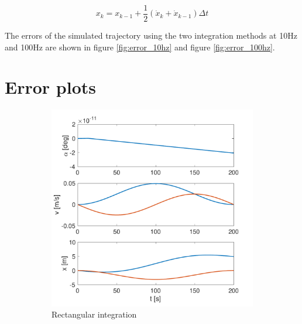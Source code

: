 \documentclass{article}
\begin{document}
\begin{equation*}
x_k = x_{k-1} + \frac{1}{2}(\dot x_k + \dot x_{k-1}) \Delta t 
\end{equation*}

The errors of the simulated trajectory using the two integration methods at 10Hz and 100Hz are shown
in figure \ref{fig:error_10hz} and figure \ref{fig:error_100hz}.

\section*{Error plots}
\begin{figure}[H]
    \centering
    \begin{subfigure}[t]{0.49\textwidth}
        \centering
        \includegraphics[width=\textwidth]{rectangular_int_10hz}
        \caption{Rectangular integration}
    \end{subfigure}
    ~
    \begin{subfigure}[t]{0.49\textwidth}
        \centering

\end{subfigure}
\end{figure}
\end{document}
